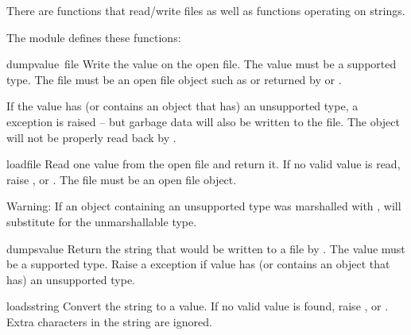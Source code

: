 There are functions that read/write files as well as functions
operating on strings.

The module defines these functions:

\renewcommand{\indexsubitem}{(in module marshal)}

\begin{funcdesc}{dump}{value\, file}
  Write the value on the open file.  The value must be a supported
  type.  The file must be an open file object such as
   or returned by  or
  .
  
  If the value has (or contains an object that has) an unsupported type,
  a  exception is raised -- but garbage data will also
  be written to the file.  The object will not be properly read back by
  .
\end{funcdesc}

\begin{funcdesc}{load}{file}
  Read one value from the open file and return it.  If no valid value
  is read, raise ,  or
  .  The file must be an open file object.

  Warning: If an object containing an unsupported type was marshalled
  with ,  will substitute  for the
  unmarshallable type.
\end{funcdesc}

\begin{funcdesc}{dumps}{value}
  Return the string that would be written to a file by
  .  The value must be a supported type.
  Raise a  exception if value has (or contains an
  object that has) an unsupported type.
\end{funcdesc}

\begin{funcdesc}{loads}{string}
  Convert the string to a value.  If no valid value is found, raise
  ,  or .  Extra
  characters in the string are ignored.
\end{funcdesc}
